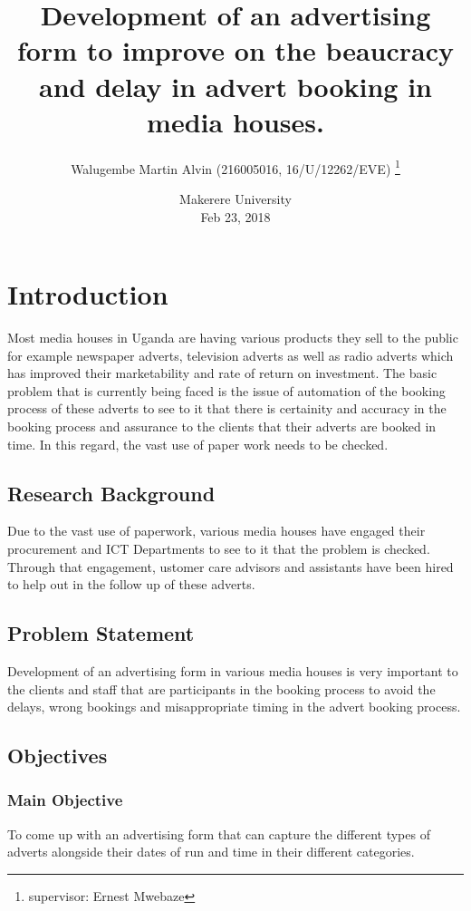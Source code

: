 \documentclass[options]{article}
\title{Development of an advertising form to improve on the beaucracy and delay in advert booking in media houses.}
\author{Walugembe Martin Alvin (216005016, 16/U/12262/EVE) \thanks{supervisor: Ernest Mwebaze}}
\date{%
    Makerere University\\%
    Feb 23, 2018
}
\begin{document}
\begin{titlepage}
\maketitle
\end{titlepage}





\section{\textbf{ Introduction}} 
Most media houses in Uganda are having various products they sell to the public for example newspaper adverts, television adverts as well as radio adverts which has improved their marketability and rate of return on investment.
The basic problem that is currently being faced is the issue of automation of the booking process of these adverts to see to it that there is certainity and accuracy in the booking process and assurance to the clients that their adverts are booked in time. In this regard, the vast use of paper work needs to be checked.\bigbreak
 
\subsection{\textbf{Research Background}}
Due to the vast use of paperwork, various media houses have engaged their procurement and ICT Departments to see to it that the problem is checked.
Through that engagement, ustomer care advisors and assistants have been hired to help out in the follow up of these adverts.
 

 \bigbreak



\subsection{\textbf{Problem Statement}}
Development of an advertising form in various media houses is very important to the clients and staff that are participants in the booking process to avoid the delays, wrong bookings and misappropriate timing in the advert booking process.

\subsection{\textbf{Objectives}}


\subsubsection{\textbf{Main Objective}} 
 To come up with an advertising form that can capture the different types of adverts alongside their dates of run and time in their different categories.
\end{document}
